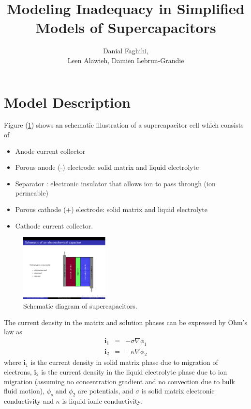 \documentclass[]{article}
\begin{document}
\title{Modeling Inadequacy in Simplified Models of Supercapacitors}
\author{Danial Faghihi,\\
Leen Alawieh,
Damien Lebrun-Grandie
}
\maketitle

\section{Model Description}

Figure (\ref{fig:supercap}) shows an schematic illustration of a supercapacitor cell which consists of
\begin{itemize}
\item Anode current collector
\item Porous anode (-) electrode: solid matrix and liquid electrolyte
\item Separator : electronic insulator that allows ion to pass through (ion permeable)
\item Porous cathode (+) electrode: solid matrix and liquid electrolyte
\item Cathode current collector.
\end{itemize}


\begin{figure}[h]
    \centering
    \includegraphics[trim = 2.4in 0.42in 0.7in 0.9in, clip, width=0.4\textwidth]{figures/supercap_schematic.pdf}  
    \caption{Schematic diagram of supercapacitors.}
    \label{fig:supercap}
\end{figure}

The current density in the matrix and solution phases can be expressed by Ohm's law as
%
\begin{eqnarray}
\mathbf{i}_1 &=& -\sigma\nabla\phi_1\\
\mathbf{i}_2 &=& -\kappa\nabla\phi_2
\end{eqnarray}
%
where $\mathbf{i}_1$ is the current density in solid matrix phase due to migration of electrons,
$\mathbf{i}_2$ is the  current density in the liquid electrolyte phase due to ion migration (assuming no concentration gradient and no convection due to bulk fluid motion),
$\phi_s$ and $\phi_2$ are potentials, and 
$\sigma$ is solid matrix electronic conductivity and $\kappa$ is liquid ionic conductivity.
\end{document}

